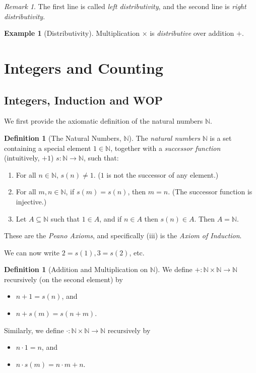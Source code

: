 \documentclass{article}
\theoremstyle{definition}
\newtheorem{definition}[theorem]{Definition}
\newtheorem{example}[theorem]{Example}
\theoremstyle{remark}
\newtheorem{remark}[theorem]{Remark}
\newcommand{\pqty}[1]{\left(#1\right)}
\newcommand{\functiondomain}[3]{#1:#2\to #3}
\newcommand{\NN}{\mathbb{N}}
\begin{document}
\begin{remark}
    The first line is called \emph{left distributivity}, and the second line is \emph{right distributivity}.
\end{remark}

\begin{example}[Distributivity]
    Multiplication \(\times\) is \emph{distributive} over addition \(+\).
\end{example}

\section{Integers and Counting}
\label{sec:integers-counting}

\subsection{Integers, Induction and WOP}
\label{sec:integers-induction-wop}

We first provide the axiomatic definition of the natural numbers \(\NN\).

\begin{definition}[The Natural Numbers, \(\NN\)]
    The \emph{natural numbers} \(\NN\) is a set containing a special element \(1 \in \NN\), together with a \emph{successor function} (intuitively, \(+ 1\)) \(\functiondomain{s}{\NN}{\NN}\), such that:
    \begin{enumerate}
        \item For all \(n \in \NN\), \(s \pqty{n} \neq 1\). (\(1\) is not the successor of any element.)
        \item For all \(m, n \in \NN\), if \(s\pqty{m} = s\pqty{n}\), then \(m = n\). (The successor function is injective.)
        \item Let \(A \subseteq \NN\) such that \(1 \in A\), and if \(n \in A\) then \(s\pqty{n} \in A\). Then \(A = \NN\).
    \end{enumerate}

    These are the \emph{Peano Axioms}, and specifically (iii) is the \emph{Axiom of Induction}.
\end{definition}

We can now write \(2 = s\pqty{1}, 3 = s\pqty{2}\), etc.

\begin{definition}[Addition and Multiplication on \(\NN\)]
    We define \(\functiondomain{+}{\NN \times \NN}{\NN}\) recursively (on the second element) by
    \begin{itemize}
        \item \(n + 1 = s\pqty{n}\), and
        \item \(n + s\pqty{m} = s\pqty{n + m}\).
    \end{itemize}

    Similarly, we define \(\functiondomain{\cdot}{\NN \times \NN}{\NN}\) recursively by
    \begin{itemize}
        \item \(n \cdot 1 = n\), and
        \item \(n \cdot s\pqty{m} = n \cdot m + n\).
    \end{itemize}
\end{definition}
\end{document}
